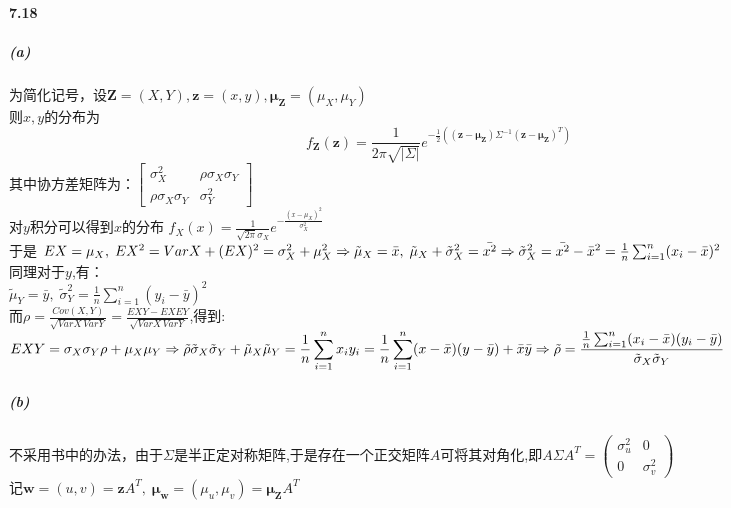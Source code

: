 \documentclass[11pt,a4paper]{ctexart}
\begin{document}
\paragraph{7.18}
\subparagraph{(a)}
为简化记号，设\(\mathbf{Z} = (X,Y) ,\mathbf{z} = (x,y) ,\mathbf{\mu_Z} = (\mu_X , \mu_Y)\)\\
 则\(x,y\)的分布为 \[f_\mathbf{Z}(\mathbf{z}) = \frac{1}{2\pi\sqrt{|\Sigma|}}e^{-\frac{1}{2}((\mathbf{z - \mu_Z})\Sigma^{-1}\mathbf{(z - \mu_Z)}^{T})}\]
 其中协方差矩阵为：\(\begin{bmatrix}
 \sigma_X^2 & \rho\sigma_X\sigma_Y\\
 \rho\sigma_X\sigma_Y & \sigma_Y^2
 \end{bmatrix}\)\\
 对\(y\)积分可以得到\(x\)的分布 \(\displaystyle f_X(x) = \frac{1}{\sqrt{2\pi}\sigma_X}e^{-\frac{(x - \mu_X)^2}{\sigma_X^2}}\)\\
 于是 \(EX = \mu_X ,\;EX^2 = VarX + (EX)^2 = \sigma_X^2 + \mu_X^2\\
 \Rightarrow \tilde{\mu}_X = \bar{x} ,\; \tilde{\mu}_X + \tilde{\sigma}_X^2 = \bar{x^2}\\
 \Rightarrow \tilde{\sigma}_X^2 = \bar{x^2} - \bar{x}^2 = \frac{1}{n}\sum_{i = 1}^{n}(x_i - \bar{x})^2\)\\
 同理对于\(y\),有：\\
 \(\tilde{\mu}_Y = \bar{y},\; \tilde{\sigma}_Y^2= \frac{1}{n}\sum_{i = 1}^{n}(y_i - \bar{y})^2\)\\
 而\(\displaystyle \rho = \frac{Cov(X,Y)}{\sqrt{VarX\, Var Y}} = \frac{EXY - EXEY}{\sqrt{VarX\,VarY}}\),得到:\\
 \(\displaystyle EXY = \sigma_X\sigma_Y\rho + \mu_X\mu_Y\\
 \Rightarrow \tilde{\rho}\tilde{\sigma}_X\tilde{\sigma}_Y + \tilde{\mu}_X\tilde{\mu}_Y = \frac{1}{n}\sum_{i = 1}^{n}x_iy_i = \frac{1}{n}\sum_{i = 1}^{n}(x - \bar{x})(y - \bar{y}) + \bar{x}\bar{y}\\
 \Rightarrow \tilde{\rho} = \frac{\frac{1}{n}\sum_{i = 1}^{n}(x_i - \bar{x})(y_i - \bar{y})}{\tilde{\sigma}_X\tilde{\sigma}_Y}\)
 \subparagraph{(b)}
 不采用书中的办法，由于\(\Sigma\)是半正定对称矩阵,于是存在一个正交矩阵\(A\)可将其对角化,即\(\displaystyle A\Sigma A^T = \begin{pmatrix}
 \sigma^2_u & 0\\
 0& \sigma^2_v
 \end{pmatrix}\)\\
 记\(\displaystyle \mathbf{w} = (u, v) = \mathbf{z}A^T , \;\mathbf{\mu_w} = (\mu_u,\mu_v)= \mathbf{\mu_Z}A^T\)
\end{document}
